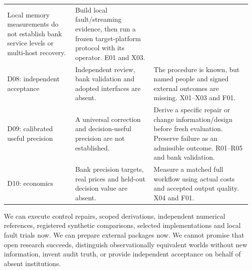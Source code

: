 \documentclass[
  11pt,
  a4paper,
]{article}
\begin{document}
\begin{longtable}[]{@{}lll@{}}
\begin{minipage}[t]{0.30\columnwidth}
Local memory measurements do not establish bank service levels or
multi-host recovery.\strut
\end{minipage} & \begin{minipage}[t]{0.30\columnwidth}\raggedright
Build local fault/streaming evidence, then run a frozen target-platform
protocol with its operator. E01 and X03.\strut
\end{minipage}\tabularnewline
\begin{minipage}[t]{0.30\columnwidth}\raggedright
D08: independent acceptance\strut
\end{minipage} & \begin{minipage}[t]{0.30\columnwidth}\raggedright
Independent review, bank validation and adopted interfaces are
absent.\strut
\end{minipage} & \begin{minipage}[t]{0.30\columnwidth}\raggedright
The procedure is known, but named people and signed external outcomes
are missing. X01--X03 and F01.\strut
\end{minipage}\tabularnewline
\begin{minipage}[t]{0.30\columnwidth}\raggedright
D09: calibrated useful precision\strut
\end{minipage} & \begin{minipage}[t]{0.30\columnwidth}\raggedright
A universal correction and decision-useful precision are not
established.\strut
\end{minipage} & \begin{minipage}[t]{0.30\columnwidth}\raggedright
Derive a specific repair or change information/design before fresh
evaluation. Preserve failure as an admissible outcome. R01--R05 and bank
validation.\strut
\end{minipage}\tabularnewline
\begin{minipage}[t]{0.30\columnwidth}\raggedright
D10: economics\strut
\end{minipage} & \begin{minipage}[t]{0.30\columnwidth}\raggedright
Bank precision targets, real prices and held-out decision value are
absent.\strut
\end{minipage} & \begin{minipage}[t]{0.30\columnwidth}\raggedright
Measure a matched full workflow using actual costs and accepted output
quality. X04 and F01.\strut
\end{minipage}\tabularnewline
\bottomrule
\end{longtable}

We can execute control repairs, scoped derivations, independent
numerical references, registered synthetic comparisons, selected
implementations and local fault trials now. We can prepare external
packages now. We cannot promise that open research succeeds, distinguish
observationally equivalent worlds without new information, invent audit
truth, or provide independent acceptance on behalf of absent
institutions.
\end{document}
